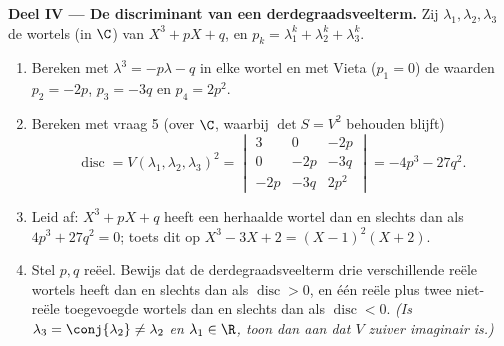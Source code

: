 \begin{problem}
\medskip
\noindent\textbf{Deel IV --- De discriminant van een
derdegraadsveelterm.} Zij $\lambda_1, \lambda_2, \lambda_3$ de
wortels (in $\C$) van $X^3 + pX + q$, en $p_k = \lambda_1^k +
\lambda_2^k + \lambda_3^k$.
\begin{enumerate}[resume]
  \item Bereken met $\lambda^3 = -p\lambda - q$ in elke wortel en
        met Vieta ($p_1 = 0$) de waarden $p_2 = -2p$, $p_3 = -3q$
        en $p_4 = 2p^2$.
  \item Bereken met vraag 5 (over $\C$, waarbij $\det S = V^2$
        behouden blijft)
        \[
        \operatorname{disc} = V(\lambda_1, \lambda_2,
        \lambda_3)^2 = \begin{vmatrix}
        3 & 0 & -2p\\
        0 & -2p & -3q\\
        -2p & -3q & 2p^2
        \end{vmatrix}
        = -4p^3 - 27q^2 .
        \]
  \item Leid af: $X^3 + pX + q$ heeft een herhaalde wortel dan en
        slechts dan als $4p^3 + 27q^2 = 0$; toets dit op $X^3 - 3X
        + 2 = (X - 1)^2(X + 2)$.
  \item Stel $p, q$ reëel. Bewijs dat de derdegraadsveelterm drie
        verschillende reële wortels heeft dan en slechts dan als
        $\operatorname{disc} > 0$, en één reële plus twee
        niet-reële toegevoegde wortels dan en slechts dan als
        $\operatorname{disc} < 0$. \emph{(Is $\lambda_3 =
        \conj{\lambda_2} \neq \lambda_2$ en $\lambda_1 \in \R$,
        toon dan aan dat $V$ zuiver imaginair is.)}
\end{enumerate}


\end{problem}
